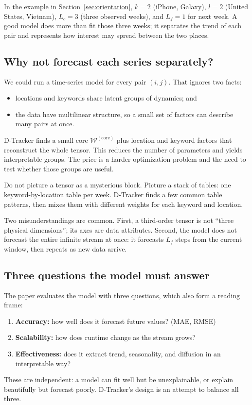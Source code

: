 In the example in Section~\ref{sec:orientation}, $k=2$ (iPhone, Galaxy), $l=2$ (United States,
Vietnam), $L_c=3$ (three observed weeks), and $L_f=1$ for next week. A good model does more than
fit those three weeks; it separates the trend of each pair and represents how interest may spread
between the two places.

\subsection{Why not forecast each series separately?}

We could run a time-series model for every pair $(i,j)$. That ignores two facts:
\begin{itemize}
  \item locations and keywords share latent groups of dynamics; and
  \item the data have multilinear structure, so a small set of factors can describe many pairs at once.
\end{itemize}
D-Tracker finds a small core $\mathcal{W}^{(\mathrm{core})}$ plus location and keyword factors that
reconstruct the whole tensor. This reduces the number of parameters and yields interpretable groups.
The price is a harder optimization problem and the need to test whether those groups are useful.

\begin{plainwords}
Do not picture a tensor as a mysterious block. Picture a stack of tables: one keyword-by-location
table per week. D-Tracker finds a few common table patterns, then mixes them with different weights
for each keyword and location.
\end{plainwords}

\begin{commonmistake}
Two misunderstandings are common. First, a third-order tensor is not ``three physical dimensions'';
its axes are data attributes. Second, the model does not forecast the entire infinite stream at
once: it forecasts $L_f$ steps from the current window, then repeats as new data arrive.
\end{commonmistake}

\subsection{Three questions the model must answer}

The paper evaluates the model with three questions, which also form a reading frame:
\begin{enumerate}
  \item \textbf{Accuracy:} how well does it forecast future values? (MAE, RMSE)
  \item \textbf{Scalability:} how does runtime change as the stream grows?
  \item \textbf{Effectiveness:} does it extract trend, seasonality, and diffusion in an interpretable way?
\end{enumerate}
These are independent: a model can fit well but be unexplainable, or explain beautifully but forecast
poorly. D-Tracker's design is an attempt to balance all three.

